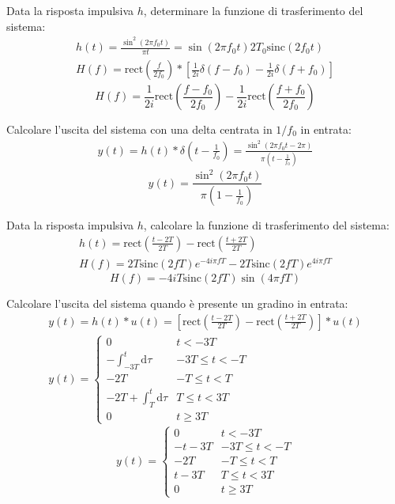 \documentclass{article}
\newcommand{\rect}{\mbox{rect}}
\newcommand{\sinc}{\mbox{sinc}}
\newcommand{\df}{\mathrm{d}}
\begin{document}
Data la risposta impulsiva $h$, determinare la funzione di trasferimento del sistema:
\begin{gather*}
    h(t)=\displaystyle\frac{\sin^2(2\pi f_0t)}{\pi t}=\sin(2\pi f_0t)2T_0\sinc(2f_0t)\\
    H(f)=\rect\left(\displaystyle\frac{f}{2f_0}\right)*\left[\frac{1}{2i}\delta\left(f-f_0\right)-\frac{1}{2i}\delta(f+f_0)\right]
\end{gather*}
\begin{equation}
    H(f)=\displaystyle\frac{1}{2i}\rect\left(\frac{f-f_0}{2f_0}\right)-\frac{1}{2i}\rect\left(\frac{f+f_0}{2f_0}\right)
\end{equation}


Calcolare l'uscita del sistema con una delta centrata in $1/f_0$ in entrata:
\begin{gather*}
    y(t)=h(t)*\delta\left(\displaystyle t-\frac{1}{f_0}\right)=\frac{\sin^2\left(2\pi f_0t-2\pi\right)}{\pi \left(t-\frac{1}{f_0}\right)}
\end{gather*}
\begin{equation}
    y(t)=\displaystyle\frac{\sin^2(2\pi f_0t)}{\pi\left(1-\frac{1}{f_0}\right)}
\end{equation}


Data la risposta impulsiva $h$, calcolare la funzione di trasferimento del sistema:
\begin{gather*}
    h(t)=\rect\left(\displaystyle\frac{t-2T}{2T}\right)-\rect\left(\frac{t+2T}{2T}\right)\\
    H(f)=2T\sinc(2fT)e^{-4i\pi fT}-2T\sinc(2fT)e^{4i\pi fT}
\end{gather*}
\begin{equation}
    H(f)=-4iT\sinc(2fT)\sin(4\pi fT)
\end{equation}


Calcolare l'uscita del sistema quando è presente un gradino in entrata:
\begin{gather*}
    y(t)=h(t)*u(t)=\left[\rect\left(\displaystyle\frac{t-2T}{2T}\right)-\rect\left(\frac{t+2T}{2T}\right)\right]*u(t)\\
    y(t)=\begin{cases}
        0 &t<-3T\\
        \displaystyle-\int_{-3T}^t\df\tau &-3T\leq t<-T\\
        -2T &-T\leq t<T\\
        -2T+\displaystyle\int_{T}^{t}\df\tau &T\leq t<3T\\
        0& t\geq 3T
    \end{cases}
\end{gather*}
\begin{equation}
    y(t)=\begin{cases}
        0 &t<-3T\\
        -t-3T&-3T\leq t<-T\\
        -2T &-T\leq t<T\\
        t-3T &T\leq t<3T\\
        0& t\geq 3T
    \end{cases}
\end{equation}
\end{document}
